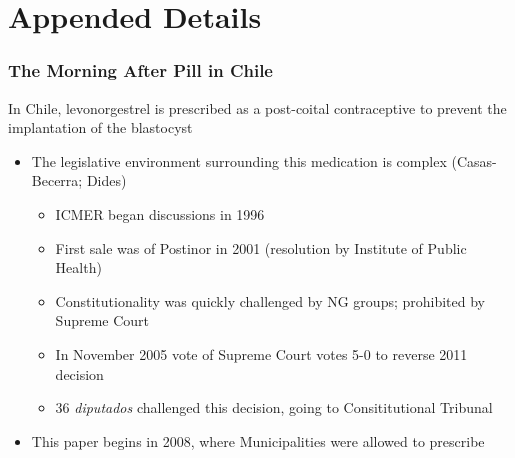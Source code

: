 \documentclass[10pt,letterpaper,subeqn]{beamer}
\begin{document}

\frame{
\textcolor{blue}{Thank you.}
}

\section{Appended Details}

\begin{frame}[label=PAE]
\frametitle{The Morning After Pill in Chile}
In Chile, levonorgestrel is prescribed as a post-coital contraceptive to prevent the implantation
of the blastocyst\\
\vspace{5mm}
\begin{itemize}
\item The legislative environment surrounding this medication is complex (Casas-Becerra; Dides)
\begin{itemize}
\item ICMER began discussions in 1996
\item First sale was of Postinor in 2001 (resolution by Institute of Public Health)
\item Constitutionality was quickly challenged by NG groups; prohibited by Supreme Court
\item In November 2005 vote of Supreme Court votes 5-0 to reverse 2011 decision
\item 36 \emph{diputados} challenged this decision, going to Consititutional Tribunal
\end{itemize}
\item This paper begins in 2008, where Municipalities were allowed to prescribe
\end{itemize}
\hyperlink{Context}{}
\end{frame}
\end{document}
